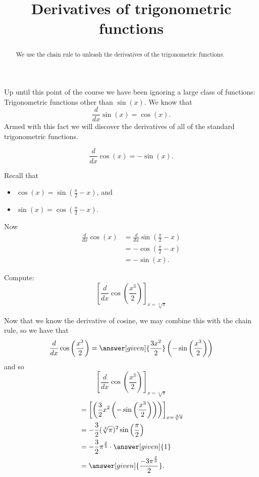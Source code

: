 \documentclass{ximera}
\title[Dig-In:]{Derivatives of trigonometric functions}
\begin{document}
\begin{abstract}
  We use the chain rule to unleash the derivatives of the
  trigonometric functions.
\end{abstract}
\maketitle

Up until this point of the course we have been ignoring a large class
of functions: Trigonometric functions other than $\sin(x)$. We know
that
\[
\frac{d}{dx} \sin(x) = \cos(x).
\]
Armed with this fact we will discover the derivatives of all of the
standard trigonometric functions.

\begin{theorem}
\[
\frac{d}{dx} \cos(x) = -\sin(x).
\]
\begin{explanation}
Recall that
\begin{itemize}
\item $\cos(x) = \sin\left(\frac{\pi}{2}-x\right)$, and
\item $\sin(x) = \cos\left(\frac{\pi}{2}-x\right)$.
\end{itemize}
Now
\begin{align*}
\frac{d}{dx} \cos(x) &= \frac{d}{dx} \sin\left(\frac{\pi}{2}-x\right)\\
&=-\cos\left(\frac{\pi}{2}-x\right) \\
&= -\sin(x).
\end{align*}
\end{explanation}
\end{theorem}

\begin{example}
Compute:
\[
\left[\frac{d}{dx} \cos \left( \frac{x^3}{2} \right)\right]_{x=\sqrt[3]{\pi}}
\]
\begin{explanation}
Now that we know the derivative of cosine, we may combine this with the
chain rule, so we have that
\[
\frac{d}{dx} \cos \left( \frac{x^3}{2} \right) = \answer[given]{\frac{3 x^2}{2}} \left(- \sin \left( \frac{x^3}{2} \right) \right)
\]
and so
\[
\left[\frac{d}{dx} \cos \left( \frac{x^3}{2} \right)\right]_{x=\sqrt[3]{\pi}}
\]
\begin{align*}
  &= \left[\left( \frac{3}{2} x^2 \left(- \sin \left( \frac{x^3}{2}
    \right) \right) \right)\right]_{x=\sqrt[3]{\pi}} \\
  &= - \frac{3}{2}(\sqrt[3]{\pi})^2 \sin \left( \frac{\pi}{2} \right) \\
  &= -\frac{3}{2} \pi^{\frac{2}{3}} \cdot \answer[given]{1} \\
  &=\answer[given]{\frac{-3 \pi^{\frac{2}{3}}}{2}}.
\end{align*}
\end{explanation}
\end{example}
\end{document}
